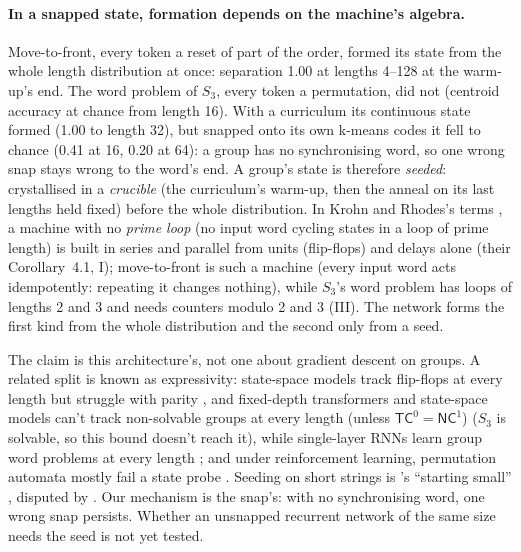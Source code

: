 \documentclass[11pt]{article}
\begin{document}
\paragraph{In a snapped state, formation depends on the machine's algebra.} Move-to-front, every token a reset of part
of the order, formed its state from the whole length distribution at once: separation 1.00 at
lengths 4--128 at the warm-up's end. The word problem of $S_3$, every token a permutation, did not
(centroid accuracy at chance from length 16). With a curriculum its continuous state formed (1.00 to
length 32), but snapped onto its own k-means codes it fell to chance (0.41 at 16, 0.20 at 64): a
group has no synchronising word, so one wrong snap stays wrong to the word's end. A group's state is
therefore \emph{seeded}: crystallised in a \emph{crucible} (the curriculum's warm-up, then the anneal
on its last lengths held fixed) before the whole distribution. In Krohn and Rhodes's terms
\citep{krohn-rhodes-1965-algebraic-theory-machines}, a machine with no \emph{prime loop} (no input
word cycling states in a loop of prime length) is built in series and parallel from units
(flip-flops) and delays alone (their Corollary~4.1, I); move-to-front is such a machine (every input word
acts idempotently: repeating it changes nothing), while $S_3$'s word problem has loops of lengths 2 and 3 and needs counters
modulo 2 and 3 (III). The network forms the first kind from the whole distribution and the second only
from a seed.

The claim is this architecture's, not one about gradient descent on groups. A related split is
known as expressivity: state-space models track flip-flops at every length but struggle with parity
\citep{sarrof-2024-expressive-capacity-ssm-formal-language}, and fixed-depth transformers and
state-space models can't track non-solvable groups at every length
(unless $\mathsf{TC}^0 = \mathsf{NC}^1$)
\citep{liu-2022-transformers-shortcuts-automata,merrill-2024-illusion-of-state-ssm} ($S_3$ is
solvable, so this bound doesn't reach it), while single-layer RNNs learn group word problems at
every length \citep{merrill-2024-illusion-of-state-ssm}; and under reinforcement learning, permutation automata
mostly fail a state probe \citep{allchin-2026-reward-teach-state-hidden-automaton}. Seeding on short
strings is \citeauthor{elman-1993-learning-development-starting-small}'s ``starting small''
\citep{elman-1993-learning-development-starting-small}, disputed by
\citet{rohde-1999-language-acquisition-starting-small}. Our mechanism is the snap's: with no
synchronising word, one wrong snap persists. Whether an unsnapped recurrent network of the same size
needs the seed is not yet tested.
\end{document}
